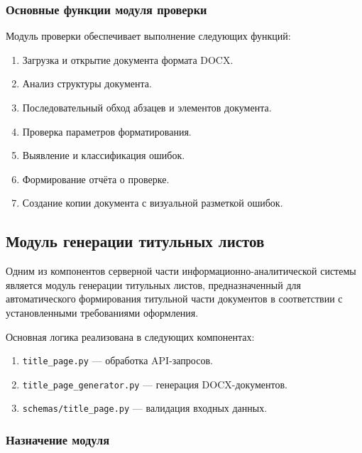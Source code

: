 \subsubsection{Основные функции модуля проверки}

Модуль проверки обеспечивает выполнение следующих функций:
\begin{enumerate}
	\item Загрузка и открытие документа формата DOCX.
	
	\item Анализ структуры документа.
	
	\item Последовательный обход абзацев и элементов документа.
	
	\item Проверка параметров форматирования.
	
	\item Выявление и классификация ошибок.
	
	\item Формирование отчёта о проверке.
	
	\item Создание копии документа с визуальной разметкой ошибок.
\end{enumerate}

\subsection{Модуль генерации титульных листов}

Одним из компонентов серверной части информационно-аналитической системы является модуль генерации титульных листов, предназначенный для автоматического формирования титульной части документов в соответствии с установленными требованиями оформления.

Основная логика реализована в следующих компонентах:
\begin{enumerate}
	\item \texttt{title\_page.py} — обработка API-запросов.
	\item \texttt{title\_page\_generator.py} — генерация DOCX-документов.
	\item \texttt{schemas/title\_page.py} — валидация входных данных.
\end{enumerate}

\subsubsection{Назначение модуля}

